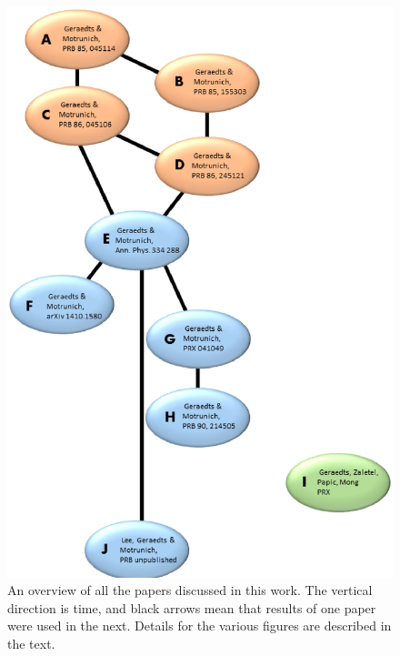 \begin{figure}
\includegraphics[width=\linewidth]{figures/publications.eps}
\caption{ An overview of all the papers discussed in this work. The vertical direction is time, and black arrows mean that results of one paper were used in the next. Details for the various figures are described in the text.
\label{papers}}
\end{figure}

